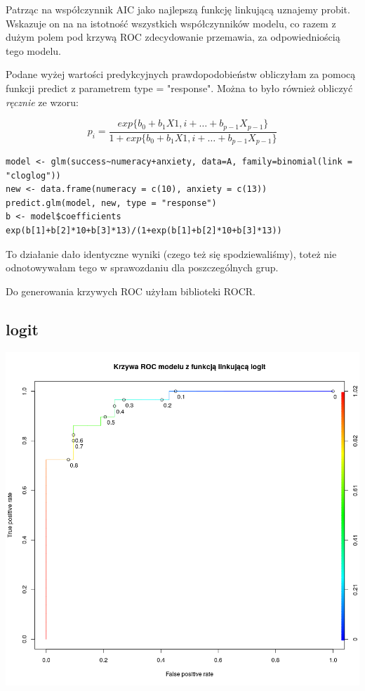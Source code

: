 \documentclass[a4paper,11pt]{article}
\begin{document}
Patrząc na współczynnik AIC jako najlepszą funkcję linkującą uznajemy probit. Wskazuje on na na istotność wszystkich współczynników modelu, co razem z dużym polem pod krzywą ROC zdecydowanie przemawia, za odpowiedniością tego modelu.

Podane wyżej wartości predykcyjnych prawdopodobieństw obliczyłam za pomocą funkcji predict z parametrem type = "response". Można to było również obliczyć \textit{ręcznie} ze wzoru:

$$ p_{i} = \frac{exp\{b_{0} + b_{1}X{1,i} + \ldots + b_{p-1}X_{p-1}\}}{1+exp\{b_{0} + b_{1}X{1,i} + \ldots + b_{p-1}X_{p-1}\}} $$

\begin{verbatim}
model <- glm(success~numeracy+anxiety, data=A, family=binomial(link = "cloglog"))
new <- data.frame(numeracy = c(10), anxiety = c(13))
predict.glm(model, new, type = "response")
b <- model$coefficients
exp(b[1]+b[2]*10+b[3]*13)/(1+exp(b[1]+b[2]*10+b[3]*13))
\end{verbatim}

To działanie dało identyczne wyniki (czego też się spodziewaliśmy), toteż nie odnotowywałam tego w sprawozdaniu dla poszczególnych grup. 

Do generowania krzywych ROC użyłam biblioteki ROCR.  

\subsection{logit}

\includegraphics[scale=.25]{plot1.png} 
\end{document}
